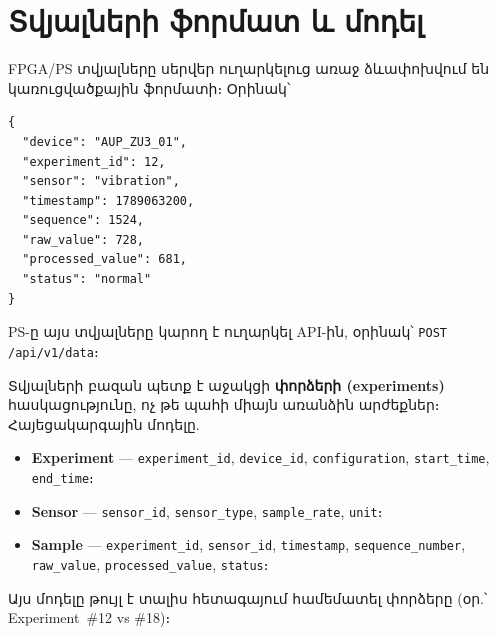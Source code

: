 \chapter{Տվյալների ֆորմատ և մոդել}

FPGA/PS տվյալները սերվեր ուղարկելուց առաջ ձևափոխվում են կառուցվածքային ֆորմատի։
Օրինակ՝

\begin{verbatim}
{
  "device": "AUP_ZU3_01",
  "experiment_id": 12,
  "sensor": "vibration",
  "timestamp": 1789063200,
  "sequence": 1524,
  "raw_value": 728,
  "processed_value": 681,
  "status": "normal"
}
\end{verbatim}

PS-ը այս տվյալները կարող է ուղարկել API-ին, օրինակ՝ \texttt{POST /api/v1/data}։

Տվյալների բազան պետք է աջակցի \textbf{փորձերի (experiments)} հասկացությունը, ոչ թե
պահի միայն առանձին արժեքներ։ Հայեցակարգային մոդելը.

\begin{itemize}[leftmargin=1.4em]
  \item \textbf{Experiment} — \texttt{experiment\_id}, \texttt{device\_id},
        \texttt{configuration}, \texttt{start\_time}, \texttt{end\_time}։
  \item \textbf{Sensor} — \texttt{sensor\_id}, \texttt{sensor\_type},
        \texttt{sample\_rate}, \texttt{unit}։
  \item \textbf{Sample} — \texttt{experiment\_id}, \texttt{sensor\_id},
        \texttt{timestamp}, \texttt{sequence\_number}, \texttt{raw\_value},
        \texttt{processed\_value}, \texttt{status}։
\end{itemize}

Այս մոդելը թույլ է տալիս հետագայում համեմատել փորձերը (օր.՝ Experiment~\#12 vs \#18)։
